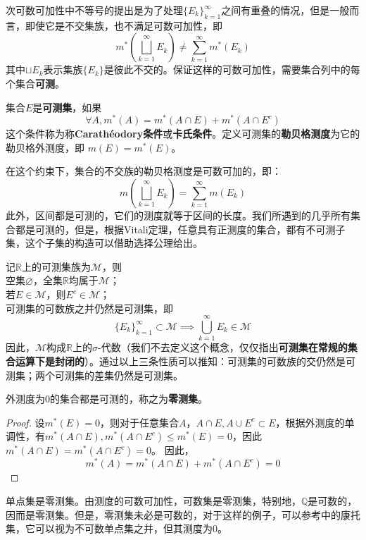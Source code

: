 次可数可加性中不等号的提出是为了处理$\{E_k\}_{k=1}^{\infty}$之间有重叠的情况，但是一般而言，即使它是不交集族，也不满足可数可加性，即
$$m^*\left(\bigsqcup_{k=1}^{\infty}E_k\right)\neq\sum_{k=1}^{\infty}m^*(E_k)$$
其中$\sqcup E_k$表示集族$\{E_k\}$是彼此不交的。保证这样的可数可加性，需要集合列中的每个集合\textbf{可测}。

\begin{definition}[可测集]
    集合$E$是\textbf{可测集}，如果
    $$\forall A,m^*(A)=m^*(A\cap E)+m^*(A\cap E^c)$$
    这个条件称为称\textbf{Carathéodory条件}或\textbf{卡氏条件}。定义可测集的\textbf{勒贝格测度}为它的勒贝格外测度，即
    $m(E)=m^*(E)$。
\end{definition}
在这个约束下，集合的不交族的勒贝格测度是可数可加的，即：
\[m\left(\bigsqcup_{k=1}^{\infty}E_k\right)=\sum_{k=1}^{\infty}m(E_k)\]
此外，区间都是可测的，它们的测度就等于区间的长度。我们所遇到的几乎所有集合都是可测的，但是，根据Vitali定理\cite{real_analysis}，任意具有正测度的集合，都有不可测子集，这个子集的构造可以借助选择公理给出。

\begin{proposition}
    记$\mathbb{R}$上的可测集族为$\mathcal{M} $，则\\
    空集$\varnothing $，全集$\mathbb{R}$均属于$\mathcal{M} $；\\
    若$E\in \mathcal{M} $，则$E^c\in \mathcal{M} $；\\
    可测集的可数族之并仍然是可测集，即
    $$\{E_k\}_{k=1}^{\infty}\subset \mathcal{M}\implies\bigcup_{k=1}^{\infty}E_k\in \mathcal{M} $$
    因此，$\mathcal{M} $构成$\mathbb{R}$上的$\sigma$-代数（我们不去定义这个概念，仅仅指出\textbf{可测集在常规的集合运算下是封闭的}）。通过以上三条性质可以推知：可测集的可数族的交仍然是可测集；两个可测集的差集仍然是可测集。
\end{proposition}

\begin{proposition}
    外测度为0的集合都是可测的，称之为\textbf{零测集}。
\end{proposition}
\begin{proof}
    设$m^*(E)=0$，则对于任意集合$A$，$A\cap E,A\cup E^c\subset E$，根据外测度的单调性，有$m^*(A\cap E),m^*(A\cap E^c)\leq m^*(E)=0$，因此$m^*(A\cap E)=m^*(A\cap E^c)=0$。
    因此，
    \[m^*(A)=m^*(A\cap E)+m^*(A\cap E^c)=0\]
\end{proof}

\begin{example}
    单点集是零测集。由测度的可数可加性，可数集是零测集，特别地，$\mathbb{Q}$是可数的，因而是零测集。但是，零测集未必是可数的，对于这样的例子，可以参考\cite{real_analysis}中的康托集，它可以视为不可数单点集之并，但其测度为0。
\end{example}

